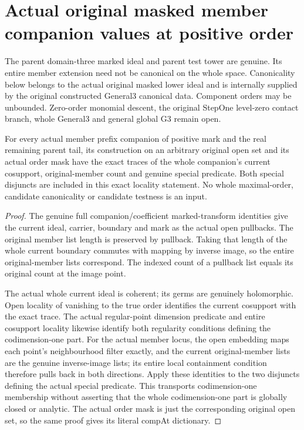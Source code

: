 \section{Actual original masked member companion values at positive order}

The parent domain-three marked ideal and parent test tower are genuine. Its
entire member extension need not be canonical on the whole space. Canonicality
below belongs to the actual original masked lower ideal and is internally
supplied by the original constructed General3 canonical data. Component
orders may be unbounded. Zero-order monomial descent, the original StepOne
level-zero contact branch, whole General3 and general global G3 remain open.

\begin{lemma}
\label{hir:member-masked-positive-actual-open-facts}
\leanok
For every actual member prefix companion of positive mark and the real
remaining parent tail, its construction on an arbitrary original open set
and its actual order mask have the exact traces of the whole companion's
current cosupport, original-member count and genuine special predicate.
Both special disjuncts are included in this exact locality statement. No
whole maximal-order, candidate canonicality or candidate testness is an input.
\end{lemma}
\begin{proof}
The genuine full companion/coefficient marked-transform identities give the
current ideal, carrier, boundary and mark as the actual open pullbacks.
The original member list length is preserved by pullback. Taking that length
of the whole current boundary commutes with mapping by inverse image, so the
entire original-member lists correspond. The indexed count of a pullback
list equals its original count at the image point.

The actual whole current ideal is coherent; its germs are genuinely
holomorphic. Open locality of vanishing to the true order identifies the
current cosupport with the exact trace. The actual regular-point dimension
predicate and entire cosupport locality likewise identify both regularity
conditions defining the codimension-one part. For the actual member locus,
the open embedding maps each point's neighbourhood filter exactly, and the
current original-member lists are the genuine inverse-image lists; its
entire local containment condition therefore pulls back in both directions.
Apply these identities to the two disjuncts defining the actual special
predicate. This transports codimension-one membership without asserting
that the whole codimension-one part is globally closed or analytic. The
actual order mask is just the corresponding original open set, so the same
proof gives its literal compAt dictionary.
\end{proof}

